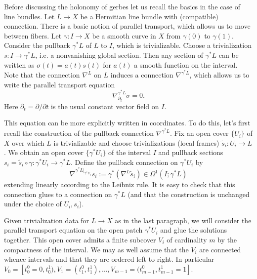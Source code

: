\documentclass{amsart}
\begin{document}
Before discussing the holonomy of gerbes let us recall the basics in the case
of line bundles. Let $L\to X$ be a Hermitian line bundle with (compatible) connection.
There is a basic notion of parallel transport, which allows us to move between fibers.
Let $\gamma:I\to X$ be a smooth curve in $X$ from $\gamma(0)$ to $\gamma(1)$. Consider
the pullback $\gamma^*L$ of $L$ to $I$, which is trivializable. Choose a trivialization
$s:I\to\gamma^*L$, i.e. a nonvanishing global section. Then any section of $\gamma^*L$
can be written as $\sigma(t) = a(t)s(t)$ for $a(t)$ a smooth function on the interval.
Note that the connection $\nabla^L$ on $L$ induces a connection $\nabla^{\gamma^*L}$,
which allows us to write the parallel transport equation
\begin{equation*}
    \nabla^{\gamma^*L}_{\partial_t} \sigma = 0.
\end{equation*}
Here $\partial_t=\partial/\partial t$ is the usual constant vector field on $I$.

This equation can be more explicitly written in coordinates. To do this, let's first recall
the construction of the pullback connection $\nabla^{\gamma^*L}$.
Fix an open cover
$\{U_i\}$ of $X$ over which $L$ is trivializable and choose trivializations (local
frames) $\tilde s_i:U_i\to L$. We obtain an open cover $\{\gamma^*U_i\}$ of the
interval $I$ and pullback sections $s_i = \tilde s_i \circ \gamma:\gamma^*U_i\to \gamma^*L$.
Define the pullback connection on $\gamma^*U_i$ by
\begin{equation*}
    \nabla^{\gamma^*L|_{\gamma^*U_i}}s_i := \gamma^*(\nabla^L \tilde s_i) \in \Omega^1(I; \gamma^*L)
\end{equation*}
extending linearly according to the Leibniz rule. It is easy to check that this connection
glues to a connection on $\gamma^*L$ (and that the construction is unchanged under
the choice of $U_i, s_i$).

Given trivialization data for $L\to X$ as in the last paragraph, we will consider
the parallel transport equation on the open patch $\gamma^*U_i$ and glue the
solutions together. This open cover admits a finite subcover $V_i$ of cardinality
$m$ by the compactness of the interval. We may as well assume that the $V_i$ are
connected whence intervals and that they are ordered left to right. In particular
$V_0=[t_0^0=0, t_0^1), V_1=(t_1^0,t_1^1),\ldots, V_{m-1}=(t_{m-1}^0, t_{m-1}^1=1]$.
\end{document}

